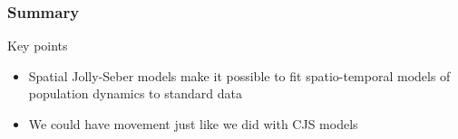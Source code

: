 \documentclass[color=usenames,dvipsnames]{beamer}\usepackage[]{graphicx}\usepackage[]{color}
\begin{document}
\begin{frame}
  \frametitle{Summary}
  \large
  {Key points}
  \begin{itemize}[<+->]
    \item Spatial Jolly-Seber models make it possible to fit
      spatio-temporal models of population dynamics to standard data
    \item We could have movement just like we did with CJS models
  \end{itemize}
\end{frame}



\end{document}
